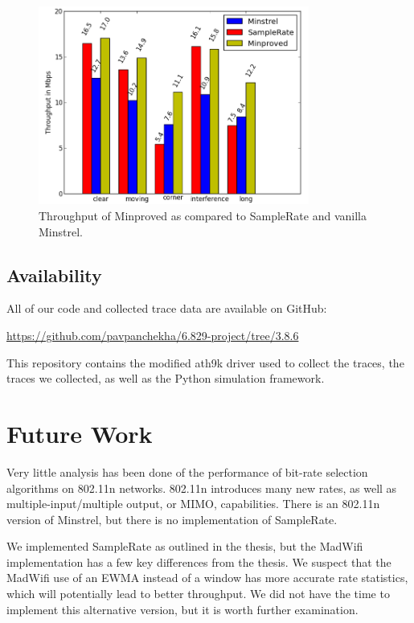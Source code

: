 \documentclass[letterpaper,twocolumn,10pt]{article}
\begin{document}
\begin{figure}[htb]
  \hspace{-2em}\includegraphics[width=3.5in]{mnVSspVSmp1.png}\vspace{-0em}
  \caption{Throughput of Minproved as compared to SampleRate and vanilla Minstrel.}
\label{figure:4}
\end{figure}


\subsection{Availability}
All of our code and collected trace data are available on GitHub:

\noindent
{\small\url{https://github.com/pavpanchekha/6.829-project/tree/3.8.6}}

This repository contains the modified ath9k driver used to collect the traces, the traces we collected, as well as the Python simulation framework. 

\section{Future Work}

Very little analysis has been done of the performance of bit-rate selection algorithms on 802.11n networks. 802.11n introduces many new rates, as well as multiple-input/multiple output, or MIMO, capabilities. There is an 802.11n version of Minstrel, but there is no implementation of SampleRate. 

We implemented SampleRate as outlined in the thesis, but the MadWifi implementation has a few key differences from the thesis. We suspect that the MadWifi use of an EWMA instead of a window has more accurate rate statistics, which will potentially lead to better throughput. We did not have the time to implement this alternative version, but it is worth further examination.
\end{document}
